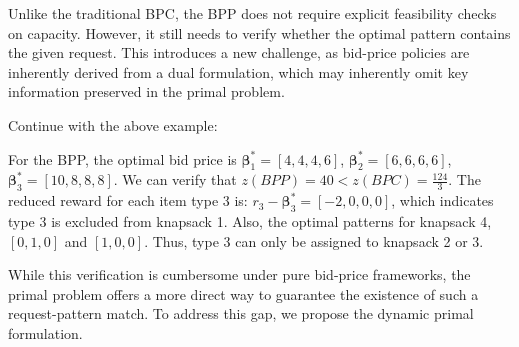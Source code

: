 




Unlike the traditional BPC, the BPP does not require explicit feasibility checks on capacity. However, it still needs to verify whether the optimal pattern contains the given request. This introduces a new challenge, as bid-price policies are inherently derived from a dual formulation, which may inherently omit key information preserved in the primal problem.

\begin{example}
Continue with the above example:

For the BPP, the optimal bid price is $\bm{\beta}_{1}^{*} = [4, 4, 4, 6]$, $\bm{\beta}_{2}^{*} = [6, 6, 6, 6]$, $\bm{\beta}_{3}^{*} = [10, 8, 8, 8]$. We can verify that  $z(BPP) = 40 < z(BPC) = \frac{124}{3}$. The reduced reward for each item type 3 is: $r_{3} - \bm{\beta}_{3}^{*} = [-2, 0, 0, 0]$, which indicates type 3 is excluded from knapsack 1. Also, the optimal patterns for knapsack 4, $[0, 1, 0]$ and $[1, 0, 0]$. Thus, type 3 can only be assigned to knapsack 2 or 3.




\end{example}

While this verification is cumbersome under pure bid-price frameworks, the primal problem offers a more direct way to guarantee the existence of such a request-pattern match. To address this gap, we propose the dynamic primal formulation.
